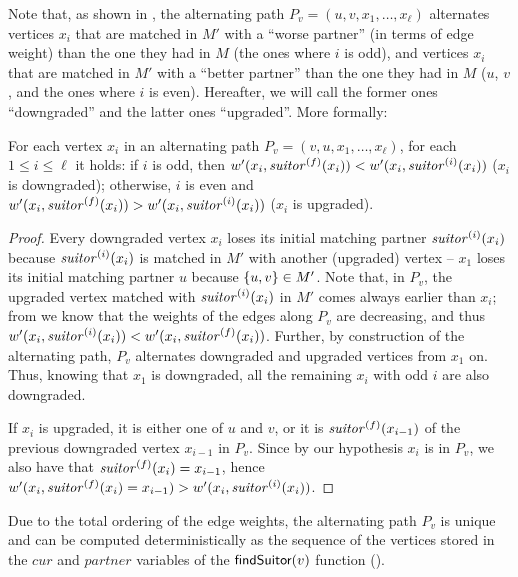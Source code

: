 Note that, as shown in , the alternating
path $P_v = (u, v, x_1, \ldots, x_\ell)$ alternates vertices $x_i$ that are
matched in $M'$ with a \enquote{worse partner} (in terms of edge weight) than
the one they had in $M$ (\ie the ones where $i$ is odd), and vertices $x_i$
that are matched in $M'$ with a \enquote{better partner} than the one they had
in $M$ (\ie $u$, $v$, and the ones where $i$ is even). Hereafter, we will call
the former ones \enquote{downgraded} and the latter ones \enquote{upgraded}.
More formally:

\begin{lemma}
\label{lemma:dyn-mwm:alternating-path-upgr-downgr}
For each vertex $x_i$ in an alternating path $P_v = (v, u, x_1, \ldots,
x_\ell)$, for each $1 \leq i \leq \ell$ it holds: if $i$ is odd, then $w'(x_i,
\mathit{suitor}^{(f)}(x_i)) < w'(x_i, \mathit{suitor}^{(i)}(x_i))$ (\ie $x_i$ is
downgraded); otherwise, $i$ is even and $w'(x_i, \mathit{suitor}^{(f)}(x_i)) > w'(x_i,
\mathit{suitor}^{(i)}(x_i))$ (\ie $x_i$ is upgraded).
\end{lemma}

\begin{proof}
Every downgraded vertex $x_i$ loses its initial matching partner
$\mathit{suitor}^{(i)}(x_i)$ because $\mathit{suitor}^{(i)}(x_i)$ is matched in $M'$ with
another (upgraded) vertex -- \eg $x_1$ loses its initial matching partner $u$
because $\set{u, v}\in M'$. Note that, in $P_v$, the upgraded vertex matched
with $\mathit{suitor}^{(i)}(x_i)$ in $M'$ comes always earlier than $x_i$; from
 we know that the weights of the edges
along $P_v$ are decreasing, and thus $w'(x_i, \mathit{suitor}^{(i)}(x_i)) < w'(x_i,
\mathit{suitor}^{(f)}(x_i))$. Further, by construction of the alternating path, $P_v$
alternates downgraded and upgraded vertices from $x_1$ on. Thus, knowing that
$x_1$ is downgraded, all the remaining $x_i$ with odd $i$ are also downgraded.

If $x_i$ is upgraded, it is either one of $u$ and $v$, or it is
$\mathit{suitor}^{(f)}(x_{i - 1})$ of the previous downgraded vertex $x_{i - 1}$ in
$P_v$. Since by our hypothesis $x_i$ is in $P_v$, we also have that
$\mathit{suitor}^{(f)}(x_i) = x_{i - 1}$, hence $w'(x_i, \mathit{suitor}^{(f)}(x_i) = x_{i -
1}) > w'(x_i, \mathit{suitor}^{(i)}(x_i))$.
\end{proof}

\begin{remark}
\label{lemma:alt-path-upg-downg-uniq}
Due to the total ordering of the edge weights,
the alternating path $P_v$ is unique and can be computed deterministically as
the sequence of the vertices stored in the $cur$ and $partner$
variables of the $\textsf{findSuitor}(v)$ function ().
\end{remark}

